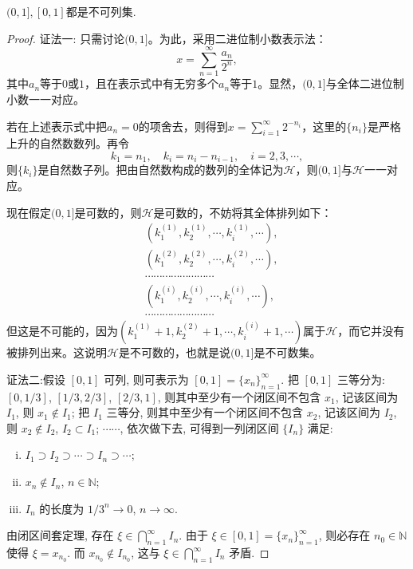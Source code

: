 \documentclass[../../main.tex]{subfiles}%
\begin{document}
\begin{theorem}
\((0,1],[0,1]\)都是不可列集.
\end{theorem}
\begin{proof}

{\color{blue}证法一:}
只需讨论\((0,1]\)。为此，采用二进位制小数表示法：
\[x = \sum_{n = 1}^{\infty}\frac{a_n}{2^n},\]
其中\(a_n\)等于\(0\)或\(1\)，且在表示式中有无穷多个\(a_n\)等于\(1\)。显然，\((0,1]\)与全体二进位制小数一一对应。

若在上述表示式中把\(a_n = 0\)的项舍去，则得到\(x=\sum_{i = 1}^{\infty}2^{-n_i}\)，这里的\(\{n_i\}\)是严格上升的自然数数列。再令
\[k_1 = n_1, \quad k_i = n_i - n_{i - 1}, \quad i = 2,3,\cdots,\]
则\(\{k_i\}\)是自然数子列。把由自然数构成的数列的全体记为\(\mathscr{H}\)，则\((0,1]\)与\(\mathscr{H}\)一一对应。

现在假定\((0,1]\)是可数的，则\(\mathscr{H}\)是可数的，不妨将其全体排列如下：
\begin{align*}
&(k_1^{(1)},k_2^{(1)},\cdots,k_i^{(1)},\cdots),\\
&(k_1^{(2)},k_2^{(2)},\cdots,k_i^{(2)},\cdots),\\
&\cdots\cdots\cdots\cdots\cdots\cdots\cdots\cdots\\
&(k_1^{(i)},k_2^{(i)},\cdots,k_i^{(i)},\cdots),\\
&\cdots\cdots\cdots\cdots\cdots\cdots\cdots\cdots
\end{align*}
但这是不可能的，因为\((k_1^{(1)} + 1,k_2^{(2)} + 1,\cdots,k_i^{(i)} + 1,\cdots)\)属于\(\mathscr{H}\)，而它并没有被排列出来。这说明\(\mathscr{H}\)是不可数的，也就是说\((0,1]\)是不可数集。

{\color{blue}证法二:}假设 $[0, 1]$ 可列, 则可表示为 $[0, 1] = \{x_n\}_{n = 1}^{\infty}$.
把 $[0, 1]$ 三等分为: $[0, 1/3]$, $[1/3, 2/3]$, $[2/3, 1]$, 则其中至少有一个闭区间不包含 $x_1$, 记该区间为 $I_1$, 则 $x_1 \notin I_1$; 把 $I_1$ 三等分, 则其中至少有一个闭区间不包含 $x_2$, 记该区间为 $I_2$, 则 $x_2 \notin I_2$, $I_2 \subset I_1$; $\cdots\cdots$, 依次做下去, 可得到一列闭区间 $\{I_n\}$ 满足:
\begin{enumerate}[(i)]
\item $I_1 \supset I_2 \supset \cdots \supset I_n \supset \cdots$;
\item $x_n \notin I_n$, $n \in \mathbb{N}$;
\item $I_n$ 的长度为 $1/3^n \to 0$, $n \to \infty$.
\end{enumerate}
由闭区间套定理, 存在 $\xi \in \bigcap_{n = 1}^{\infty} I_n$. 由于 $\xi \in [0, 1] = \{x_n\}_{n = 1}^{\infty}$, 则必存在 $n_0 \in \mathbb{N}$ 使得 $\xi = x_{n_0}$. 而 $x_{n_0} \notin I_{n_0}$, 这与 $\xi \in \bigcap_{n = 1}^{\infty} I_n$ 矛盾. 
\end{proof}
\end{document}
